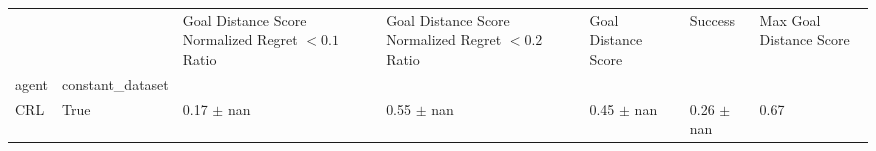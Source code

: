 \begin{tabular}{lllllll}
\toprule
 &  & Goal Distance Score Normalized Regret $< 0.1$ Ratio & Goal Distance Score Normalized Regret $< 0.2$ Ratio & Goal Distance Score & Success & Max Goal Distance Score \\
agent & constant_dataset &  &  &  &  &  \\
\midrule
CRL & True & 0.17 $\pm$ nan & 0.55 $\pm$ nan & 0.45 $\pm$ nan & 0.26 $\pm$ nan & 0.67 \\
\cline{1-7}
\bottomrule
\end{tabular}

